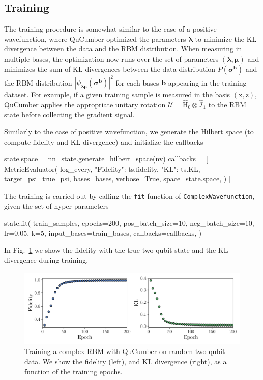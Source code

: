 \documentclass[submission, Phys, hidelinks]{SciPost}
\begin{document}
\subsection{Training}
The training procedure is somewhat similar to the case of a positive wavefunction, where QuCumber optimized the parameters $\bm{\lambda}$ to minimize the KL divergence between the data and the RBM distribution. When measuring in multiple bases, the optimization now runs over the set of parameters $(\bm{\lambda},\bm{\mu})$ and minimizes the sum of KL divergences between the data distribution $P(\bm{\sigma}^{\bm{b}})$ and the RBM distribution $|\psi_{\bm{\lambda\mu}}(\bm{\sigma}^{\bm{b}})|^2$ for each bases $\bm{b}$ appearing in the training dataset. For example, if a given training sample is measured in the basis $(\mathrm{x},\mathrm{z})$, QuCumber applies the appropriate unitary rotation $\bm{\mathcal{U}}=\hat{\mathrm{H}}_0\otimes\hat{\mathcal{I}}_1$ to the RBM state before collecting the gradient signal. 

Similarly to the case of positive wavefunction, we generate the Hilbert space (to compute fidelity and KL divergence) and initialize the callbacks
\begin{python}
state.space = nn_state.generate_hilbert_space(nv)
callbacks = [
  MetricEvaluator(
    log_every,
    {"Fidelity": ts.fidelity, "KL": ts.KL},
    target_psi=true_psi,
    bases=bases,
    verbose=True,
    space=state.space,
  )
]

\end{python}
The training is carried out by calling the \verb|fit| function of \verb|ComplexWavefunction|, given the set of hyper-parameters
\begin{python}
state.fit(
	train_samples,
	epochs=200,
	pos_batch_size=10,
	neg_batch_size=10,
	lr=0.05,
	k=5,
	input_bases=train_bases,
	callbacks=callbacks,
)
\end{python}

In Fig.~\ref{fig:complex} we show the fidelity with the true two-qubit state and the KL divergence during training. 
\begin{figure}[htb]
	\centering{}
	\includegraphics[width=\textwidth]{plots/complex_fid_KL.pdf}
	\caption{\label{fig:complex} Training a complex RBM with QuCumber on random two-qubit data. We show the fidelity (left), and KL divergence (right), as a function of the training epochs.}
\end{figure}
\end{document}
